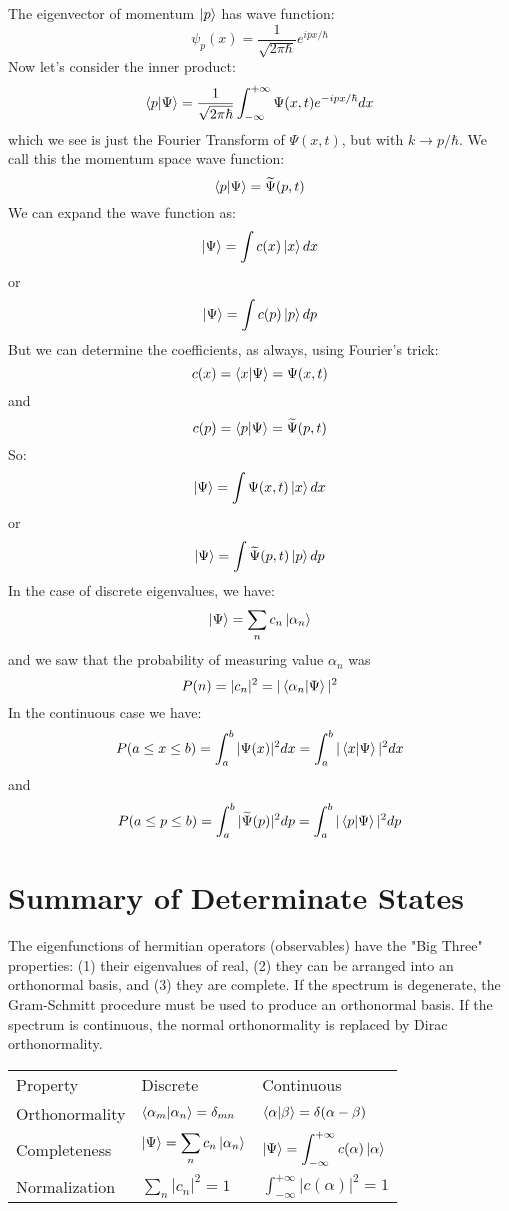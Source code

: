 \documentclass[12pt]{book}
\begin{document}
The eigenvector of momentum $\ket{p}$ has wave function:
$$\psi_p(x) = \frac{1}{\sqrt{2\pi \hbar}} e^{\displaystyle i p x / \hbar}$$
Now let's consider the inner product:
$$\braket{p|\Psi} = \frac{1}{\sqrt{2\pi\hbar}}\int_{-\infty}^{+\infty} \Psi(x,t) e^{-ipx/\hbar} dx $$
which we see is just the Fourier Transform of $\Psi(x,t)$, but with $k \to p/\hbar$.   We call this the momentum space wave function:
$$\braket{p|\Psi} = \widetilde{\Psi}(p,t)$$
We can expand the wave function as:
$$\ket{\Psi} = \int c(x) \ket{x} dx$$
or
$$\ket{\Psi} = \int c(p) \ket{p} dp$$
But we can determine the coefficients, as always, using Fourier's trick:
$$c(x) = \braket{x|\Psi} = \Psi(x,t)$$
and
$$c(p) = \braket{p|\Psi} = \widetilde{\Psi}(p,t)$$
So:
$$\ket{\Psi} = \int \Psi(x,t) \ket{x} dx$$
or
$$\ket{\Psi} = \int \widetilde{\Psi}(p,t) \ket{p} dp$$
In the case of discrete eigenvalues, we have:
$$\ket{\Psi} = \sum_n c_n \ket{\alpha_n}$$
and we saw that the probability of measuring value $\alpha_n$ was 
$$P(n) = |c_n|^2 = |\braket{\alpha_n|\Psi}|^2$$
In the continuous case we have:
$$P(a\leq x \leq b) = \int_{a}^{b}|\Psi(x)|^2 dx = \int_{a}^{b}|\braket{x|\Psi}|^2 dx$$
and
$$P(a \leq p \leq b) = \int_{a}^{b}|\widetilde{\Psi}(p)|^2 dp = \int_{a}^{b}|\braket{p|\Psi}|^2 dp$$

 



\section{Summary of Determinate States}

The eigenfunctions of hermitian operators (observables) have the "Big Three" properties:  (1) their eigenvalues of real, (2) they can be arranged into an orthonormal basis, and (3) they are complete.
If the spectrum is degenerate, the Gram-Schmitt procedure must be used to produce an orthonormal basis.   If the spectrum is continuous, the normal orthonormality is replaced by Dirac orthonormality.

\begin{center}
\begin{tabular}{lll}
Property       & Discrete & Continuous \\[8pt]
Orthonormality & $\braket{\alpha_m|\alpha_n} = \delta_{mn}$ & $\braket{\alpha|\beta} = \delta(\alpha-\beta)$ \\[8pt]
Completeness   & $\displaystyle \ket{\Psi} = \sum_n c_n \ket{\alpha_n}$ & 
$\displaystyle \ket{\Psi} = \int_{-\infty}^{+\infty} c(\alpha) \ket{\alpha}$\\[8pt]
Normalization  & $\displaystyle \sum_n |c_n|^2 = 1$ & 
$\displaystyle \int_{-\infty}^{+\infty} |c(\alpha)|^2  = 1$ \\[8pt]
\end{tabular}
\end{center}
\end{document}
